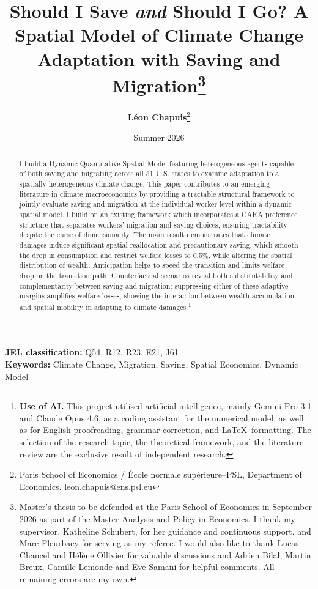 \documentclass[12pt, a4paper]{article}
\begin{document}
\title{\Large \textbf{Should I Save \textit{and} Should I Go? A Spatial Model of Climate Change Adaptation with Saving and Migration}\thanks{Master's thesis to be defended at the Paris School of Economics in September 2026 as part of the Master Analysis and Policy in Economics. I thank my supervisor, Katheline Schubert, for her guidance and continuous support, and Marc Fleurbaey for serving as my referee. I would also like to thank Lucas Chancel and Hélène Ollivier for valuable discussions and Adrien Bilal, Martin Breux, Camille Lemonde and Eve Samani for helpful comments. All remaining errors are my own.}}
\author{
    \textbf{Léon Chapuis}\thanks{Paris School of Economics / École normale supérieure--PSL, Department of Economics. \href{mailto:leon.chapuis@ens.psl.eu}{leon.chapuis@ens.psl.eu}}
}
\date{Summer 2026}
\maketitle
\thispagestyle{plain}
\begin{abstract}
\noindent
I build a Dynamic Quantitative Spatial Model featuring heterogeneous agents capable of both saving and migrating across all 51 U.S. states to examine adaptation to a spatially heterogeneous climate change. This paper contributes to an emerging literature in climate macroeconomics by providing a tractable structural framework to jointly evaluate saving and migration at the individual worker level within a dynamic spatial model. I build on an existing framework which incorporates a CARA preference structure that separates workers' migration and saving choices, ensuring tractability despite the curse of dimensionality. The main result demonstrates that climate damages induce significant spatial reallocation and precautionary saving, which smooth the drop in consumption and restrict welfare losses to 0.5\%, while altering the spatial distribution of wealth. Anticipation helps to speed the transition and limits welfare drop on the transition path. Counterfactual scenarios reveal both substitutability and complementarity between saving and migration; suppressing either of these adaptive margins amplifies welfare losses, showing the interaction between wealth accumulation and spatial mobility in adapting to climate damages.\footnote{\textbf{Use of AI.} This project utilised artificial intelligence, mainly Gemini Pro 3.1 and Claude Opus 4.6, as a coding assistant for the numerical model, as well as for English proofreading, grammar correction, and \LaTeX\ formatting. The selection of the research topic, the theoretical framework, and the literature review are the exclusive result of independent research.\par
}
\end{abstract}
\vspace{0.8em}
\noindent \textbf{JEL classification:} Q54, R12, R23, E21, J61 \\
\textbf{Keywords:} Climate Change, Migration, Saving, Spatial Economics, Dynamic Model
\clearpage
\end{document}
